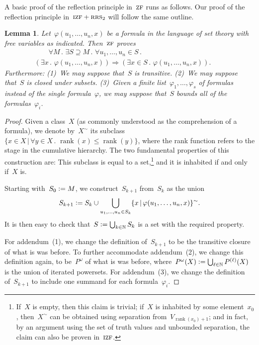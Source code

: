 \documentclass[oneside,reqno]{amsart}
\theoremstyle{definition}
\theoremstyle{plain}
\newtheorem{lemma}[defn]{Lemma}
\theoremstyle{remark}
\newcommand{\NN}{\mathbb{N}}
\newcommand{\defeq}{\vcentcolon=}
\DeclareMathOperator{\rank}{rank}
\renewcommand{\_}{\mathpunct{.}\,}
\newcommand{\?}{\,{:}\,}
\newcommand{\ZF}{\textsc{zf}}
\newcommand{\IZF}{\textsc{izf}}
\newcommand{\RRS}{\textsc{rrs}}
\begin{document}
A basic proof of the reflection principle in~$\ZF$ runs as follows. Our proof
of the reflection principle in~$\IZF+\RRS_2$ will follow the same outline.

\begin{lemma}\label{lemma:zf-smallstep}
Let~$\varphi(u_1,\ldots,u_n,x)$ be a formula in the language of set
theory with free variables as indicated. Then~$\ZF$ proves
\begin{multline*}
  {\qquad}\forall M\_
  \exists S \supseteq M\_
  \forall u_1,\ldots,u_n \in S\_ \\
  (\exists x\_ \varphi(u_1,\ldots,u_n,x)) \Longrightarrow
  (\exists x \in S\_ \varphi(u_1,\ldots,u_n,x)).{\qquad}
\end{multline*}
Furthermore: (1)~We may suppose that~$S$ is transitive. (2)~We may suppose that~$S$ is
closed under subsets. (3)~Given a finite list~$\varphi_1,\ldots,\varphi_s$
of formulas instead of the single formula~$\varphi$, we may suppose that~$S$
bounds all of the formulas~$\varphi_i$.
\end{lemma}

\begin{proof}Given a class~$X$ (as commonly understood as the comprehension of
a formula), we denote by~$X^\sim$ its subclass~$\{ x \in X \,|\, \forall y
\in X\_ \rank(x) \leq \rank(y) \}$, where the rank function refers to the stage
in the cumulative hierarchy. The two fundamental properties of this construction are:
This subclass is equal to a set,\footnote{If~$X$ is empty, then
this claim is trivial; if~$X$ is inhabited by some element~$x_0$, then~$X^\sim$ can
be obtained using separation from~$V_{\rank(x_0)+1}$; and in fact, by an argument
using the set of truth values and unbounded separation, the claim can also be
proven in~$\IZF$.} and it is inhabited if and only if~$X$ is.

Starting with~$S_0 \defeq M$, we construct~$S_{k+1}$ from~$S_k$ as the union
\[ S_{k+1} \defeq S_k \cup \bigcup_{u_1,\ldots,u_n \in S_k} \{ x \,|\,
\varphi(u_1,\ldots,u_n,x) \}^\sim. \]
It is then easy to check that~$S \defeq \bigcup_{k \in \NN} S_k$ is a set with the
required property.

For addendum~(1), we change the definition of~$S_{k+1}$ to be the transitive
closure of what is was before. To further accommodate addendum~(2), we change
this definition again, to be~$P^\omega$ of what is was before,
where~$P^\omega(X) \defeq \bigcup_{\ell \in \NN} P^{(\ell)}(X)$ is the union of
iterated powersets. For addendum~(3), we change the definition of~$S_{k+1}$ to
include one summand for each formula~$\varphi_i$.
\end{proof}
\end{document}
